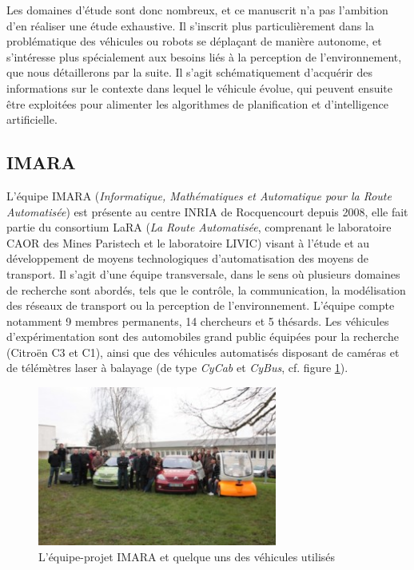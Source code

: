 Les domaines d'étude sont donc nombreux, et ce manuscrit n'a pas l'ambition d'en réaliser une étude exhaustive. Il s'inscrit plus particulièrement dans la problématique des véhicules ou robots se déplaçant de manière autonome, et s'intéresse plus spécialement aux besoins liés à la perception de l'environnement, que nous détaillerons par la suite. Il s'agit schématiquement d'acquérir des informations sur le contexte dans lequel le véhicule évolue, qui peuvent ensuite être exploitées pour alimenter les algorithmes de planification et d'intelligence artificielle.

\subsection{IMARA}
L'équipe IMARA (\emph{Informatique, Mathématiques et Automatique pour la Route Automatisée}) est présente au centre INRIA de Rocquencourt depuis 2008, elle fait partie du consortium LaRA (\emph{La Route Automatisée}, comprenant le laboratoire CAOR des Mines Paristech et le laboratoire LIVIC) visant à l'étude et au développement de moyens technologiques d'automatisation des moyens de transport. Il s'agit d'une équipe transversale, dans le sens où plusieurs domaines de recherche sont abordés, tels que le contrôle, la communication, la modélisation des réseaux de transport ou la perception de l'environnement. L'équipe compte notamment 9 membres permanents, 14 chercheurs et 5 thésards. Les véhicules d'expérimentation sont des automobiles grand public équipées pour la recherche (Citroën C3 et C1), ainsi que des véhicules automatisés disposant de caméras et de télémètres laser à balayage (de type \emph{CyCab} et \emph{CyBus}, cf. figure \ref{fig:ch1_IMARA}).

\begin{figure}
	\centering
	\includegraphics[width=0.7\textwidth]{Chapter1/graphics/imara.jpg}
	\caption{L'équipe-projet IMARA et quelque uns des véhicules utilisés}
	\label{fig:ch1_IMARA}
\end{figure}

